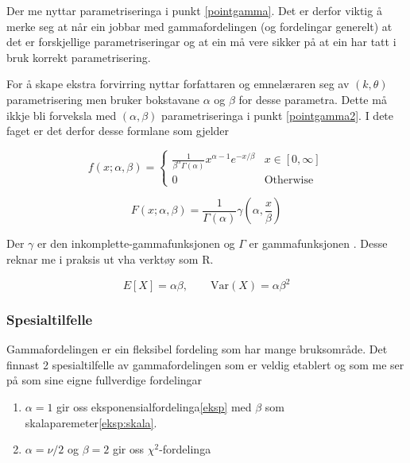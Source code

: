 Der me nyttar parametriseringa i punkt \ref{pointgamma}. Det er derfor viktig å merke seg at når ein jobbar med gammafordelingen (og fordelingar generelt) at det er forskjellige parametriseringar og at ein må vere sikker på at ein har tatt i bruk korrekt parametrisering.

For å skape ekstra forvirring nyttar forfattaren og emnelæraren seg av $(k, \theta)$ parametrisering men bruker bokstavane $\alpha$ og $\beta$ for desse parametra. Dette må ikkje bli forveksla med $(\alpha, \beta)$ parametriseringa i punkt \ref{pointgamma2}. I dete faget er det derfor desse formlane som gjelder

\begin{equation}
    f(x; \alpha, \beta) = 
    \begin{cases}
        \frac{1}{\beta^\alpha \Gamma(\alpha)}x^{\alpha - 1}e^{-x/\beta} & x \in [0, \infty] \\
        0 & \text{Otherwise}
    \end{cases}
\end{equation}

\begin{equation}
    F(x; \alpha, \beta) = \frac{1}{\Gamma(\alpha)}\gamma\left(\alpha, \frac{x}{\beta}\right)
\end{equation}

Der $\gamma$ er den inkomplette-gammafunksjonen \cite{wiki:incomgamma} og $\Gamma$ er gammafunksjonen \cite{walpole2012probability}. Desse reknar me i praksis ut vha verktøy som R. 

\begin{equation}
    E[X] = \alpha\beta, \qquad \text{Var}(X) = \alpha\beta^2
\end{equation}

\subsubsection{Spesialtilfelle}

Gammafordelingen er ein fleksibel fordeling som har mange bruksområde. Det finnast 2 spesialtilfelle av gammafordelingen som er veldig etablert og som me ser på som sine eigne fullverdige fordelingar

\begin{enumerate}
    \item $\alpha = 1$ gir oss eksponensialfordelinga\ref{eksp} med $\beta$ som skalaparemeter\ref{eksp:skala}.
    \item $\alpha = \nu/2$ og $\beta = 2$ gir oss $\chi^2$-fordelinga
\end{enumerate}

